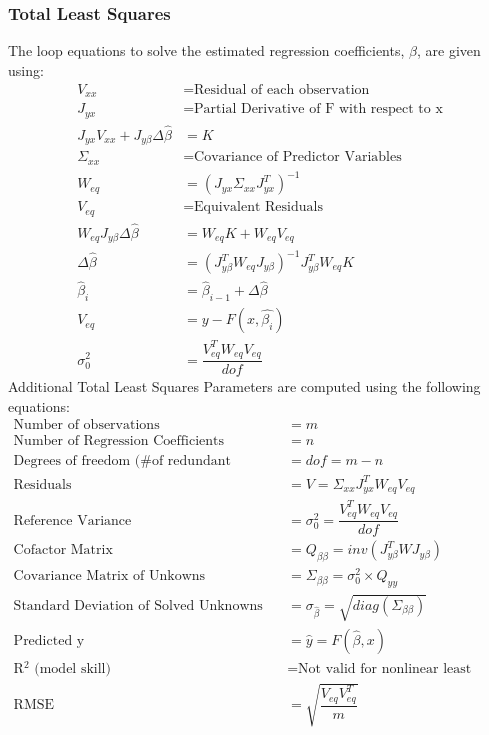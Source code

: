 \documentclass{article}
\begin{document}
	\subsubsection*{Total Least Squares}
	The loop equations to solve the estimated regression coefficients, $\hat{\beta}$, are given using:
	\begin{align*}
	V_{xx} &= \text{Residual of each observation} \\
	J_{yx} &= \text{Partial Derivative of F with respect to x} \\
	J_{yx}V_{xx} + J_{y\beta}\Delta\hat{\beta} &= K\\
	\Sigma_{xx} &= \text{Covariance of Predictor Variables} \\
	W_{eq} &= (J_{yx}\Sigma_{xx}J_{yx}^T)^{-1}\\
	V_{eq} &= \text{Equivalent Residuals} \\
	W_{eq}J_{y\beta}\Delta\hat{\beta} &= W_{eq}K + W_{eq}V_{eq} \\
	\Delta\hat{\beta} &= (J_{y\beta}^TW_{eq}J_{y\beta})^{-1}J_{y\beta}^TW_{eq}K \\
	\hat{\beta}_i &= \hat{\beta}_{i-1} + \Delta\hat{\beta} \\
	V_{eq} &= y - F(x,\hat{\beta_i}) \\
	\sigma_0^2 &= \dfrac{V_{eq}^TW_{eq}V_{eq}}{dof}  
	\end{align*}
	Additional Total Least Squares Parameters are computed using the following equations:
	\begin{align*}
	\text{Number of observations} &= m \\ 
	\text{Number of Regression Coefficients} &= n  \\
	\text{Degrees of freedom (\# of redundant observations)} &= dof = m-n \\
	\text{Residuals} &= V = \Sigma_{xx} J_{yx}^T W_{eq} V_{eq} \\
	\text{Reference Variance} &= \sigma_0^2 = \dfrac{V_{eq}^TW_{eq}V_{eq}}{dof} \\
	\text{Cofactor Matrix} &= Q_{\beta\beta} = inv(J_{y\beta}^TWJ_{y\beta}) \\
	\text{Covariance Matrix of Unkowns} &= \Sigma_{\beta\beta} = \sigma_0^2 \times Q_{yy} \\
	\text{Standard Deviation of Solved Unknowns} &= \sigma_{\hat{\beta}} = \sqrt{diag(\Sigma_{\beta\beta})} \\
	\text{Predicted y} &= \hat{y} = F(\hat{\beta},x)\\
	\text{R$^2$ (model skill)} &= \text{Not valid for nonlinear least squares} \\
	\text{RMSE } &= \sqrt{\dfrac{V_{eq}V_{eq}^T}{m}} \\
	\end{align*}
	
\end{document}
